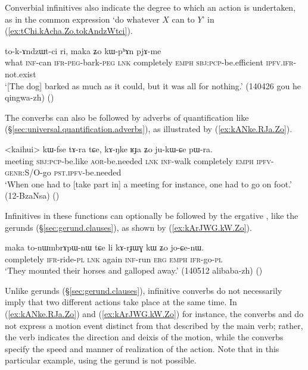 Converbial infinitives also indicate the degree to which an action is undertaken, as in the common expression  `do whatever $X$ can to $Y$' in (\ref{ex:tChi.kAcha.Zo.tokAndzWtci}).

\begin{exe}
\ex \label{ex:tChi.kAcha.Zo.tokAndzWtci}
 to-k-ɤndzɯt-ci ri, maka ʑo kɯ-pʰɤn pjɤ-me \\
what \textsc{inf}-can  \textsc{ifr}-\textsc{peg}-bark-\textsc{peg}  \textsc{lnk} completely \textsc{emph} \textsc{sbj}:\textsc{pcp}-be.efficient \textsc{ipfv}.\textsc{ifr}-not.exist \\
\glt `[The dog] barked as much as it could, but it was all for nothing.'  (140426 gou he qingwa-zh)
()
\end{exe}

The converbs can also be followed by adverbs of quantification like  (§\ref{sec:universal.quantification.adverbs}), as illustrated by (\ref{ex:kANke.RJa.Zo}).

\begin{exe}
\ex \label{ex:kANke.RJa.Zo}
\gll <kaihui> kɯ-fse tɤ-ra tɕe, kɤ-ŋke ʁɟa ʑo ju-kɯ-ɕe pɯ-ra. \\
meeting \textsc{sbj}:\textsc{pcp}-be.like \textsc{aor}-be.needed \textsc{lnk} \textsc{inf}-walk completely \textsc{emph} \textsc{ipfv}-\textsc{genr}:S/O-go \textsc{pst}.\textsc{ipfv}-be.needed \\
\glt `When one had to [take part in] a meeting for instance, one had to go on foot.' (12-BzaNsa)
()
\end{exe}

Infinitives in these functions can optionally be followed by the ergative , like the gerunds (§\ref{sec:gerund.clauses}), as shown by (\ref{ex:kArJWG.kW.Zo}). 

\begin{exe}
\ex \label{ex:kArJWG.kW.Zo}
\gll maka to-nɯmbrɤpɯ-nɯ tɕe li kɤ-rɟɯɣ kɯ ʑo jo-ɕe-nɯ. \\
completely \textsc{ifr}-ride-\textsc{pl} \textsc{lnk} again \textsc{inf}-run \textsc{erg} \textsc{emph} \textsc{ifr}-go-\textsc{pl} \\
\glt `They mounted their horses and galloped away.' (140512 alibaba-zh)
()
\end{exe}

Unlike gerunds (§\ref{sec:gerund.clauses}), infinitive converbs do not necessarily imply that two different actions take place at the same time. In (\ref{ex:kANke.RJa.Zo}) and (\ref{ex:kArJWG.kW.Zo}) for instance, the converbs  and  do not express a motion event distinct from that described by the main verb; rather, the verb  indicates the direction and deixis of the motion, while the converbs specify the speed and manner of realization of the action. Note that in this particular example, using the gerund is not possible.

